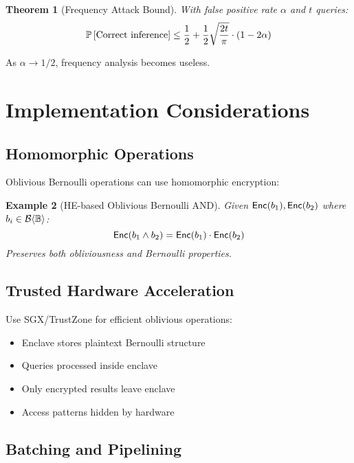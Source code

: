 \documentclass[11pt,final]{article}
\newcommand{\BernBool}{\mathcal{B}\langle \Bool \rangle}
\newcommand{\fprate}{\alpha}
\newtheorem{theorem}{Theorem}[section]
\newtheorem{example}[theorem]{Example}
\begin{document}
\begin{theorem}[Frequency Attack Bound]
With false positive rate $\fprate$ and $t$ queries:
\begin{equation}
\Prob{\text{Correct inference}} \leq \frac{1}{2} + \frac{1}{2}\sqrt{\frac{2t}{\pi}} \cdot (1 - 2\fprate)
\end{equation}
\end{theorem}

As $\fprate \to 1/2$, frequency analysis becomes useless.

\section{Implementation Considerations}

\subsection{Homomorphic Operations}

Oblivious Bernoulli operations can use homomorphic encryption:

\begin{example}[HE-based Oblivious Bernoulli AND]
Given $\mathsf{Enc}(b_1), \mathsf{Enc}(b_2)$ where $b_i \in \BernBool$:
\begin{equation}
\mathsf{Enc}(b_1 \land b_2) = \mathsf{Enc}(b_1) \cdot \mathsf{Enc}(b_2)
\end{equation}
Preserves both obliviousness and Bernoulli properties.
\end{example}

\subsection{Trusted Hardware Acceleration}

Use SGX/TrustZone for efficient oblivious operations:
\begin{itemize}
    \item Enclave stores plaintext Bernoulli structure
    \item Queries processed inside enclave
    \item Only encrypted results leave enclave
    \item Access patterns hidden by hardware
\end{itemize}

\subsection{Batching and Pipelining}
\end{document}
